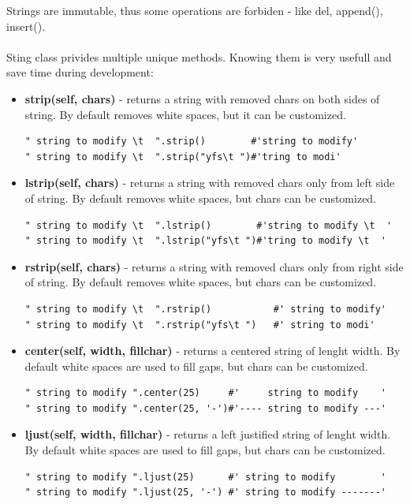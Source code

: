 \documentclass{article}
\begin{document}
Strings are immutable, thus some operations are forbiden - like del, append(), insert(). 
\paragraph{}

Sting class privides multiple unique methods. Knowing them is very usefull and save time during development:
\begin{itemize}
\item \textbf{strip(self, chars)} - returns a string with removed chars on both sides of string. By default removes white spaces, but it can be customized.
\begin{lstlisting}[style=pystyle]
" string to modify \t  ".strip()		#'string to modify'
" string to modify \t  ".strip("yfs\t ")#'tring to modi'
\end{lstlisting}

\item \textbf{lstrip(self, chars)} - returns a string with removed chars only from left side of string. By default removes white spaces, but chars can be customized.
\begin{lstlisting}[style=pystyle]
" string to modify \t  ".lstrip()		 #'string to modify \t  '
" string to modify \t  ".lstrip("yfs\t ")#'tring to modify \t  '
\end{lstlisting}

\item \textbf{rstrip(self, chars)} - returns a string with removed chars only from right side of string. By default removes white spaces, but chars can be customized.
\begin{lstlisting}[style=pystyle]
" string to modify \t  ".rstrip()			#' string to modify'
" string to modify \t  ".rstrip("yfs\t ")	#' string to modi'
\end{lstlisting}

\item \textbf{center(self, width, fillchar)} - returns a centered string of lenght width. By default white spaces are used to fill gaps, but chars can be customized.
\begin{lstlisting}[style=pystyle]
" string to modify ".center(25)		#'     string to modify    '
" string to modify ".center(25, '-')#'---- string to modify ---'
\end{lstlisting}

\item \textbf{ljust(self, width, fillchar)} - returns a left justified string of lenght width. By default white spaces are used to fill gaps, but chars can be customized.
\begin{lstlisting}[style=pystyle]
" string to modify ".ljust(25)		#' string to modify        '
" string to modify ".ljust(25, '-')	#' string to modify -------'
\end{lstlisting}


\end{itemize}
\end{document}
